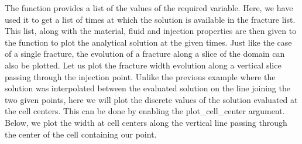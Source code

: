 \documentclass[letterpaper,10pt,english]{sphinxmanual}
\begin{document}
\begin{sphinxVerbatim}[commandchars=\\\{\}]
   
   

   
  
\end{sphinxVerbatim}

\sphinxAtStartPar
The function  provides a list of the values of the required variable. Here, we have used it to get a list of times at which the solution is available in the fracture list. This list, along with the material, fluid and injection properties are then given to the  function to plot the analytical solution at the given times. Just like the case of a single fracture, the evolution of a fracture along a slice of the domain can also be plotted. Let us plot the fracture width evolution along a vertical slice passing through the injection point. Unlike the previous example where the solution was interpolated between the evaluated solution on the line joining the two given points, here we will plot the discrete values of the solution evaluated at the cell centers. This can be done by enabling the plot\_cell\_center argument. Below, we plot the width at cell centers along the vertical line passing through the center of the cell containing our point.
\end{document}
